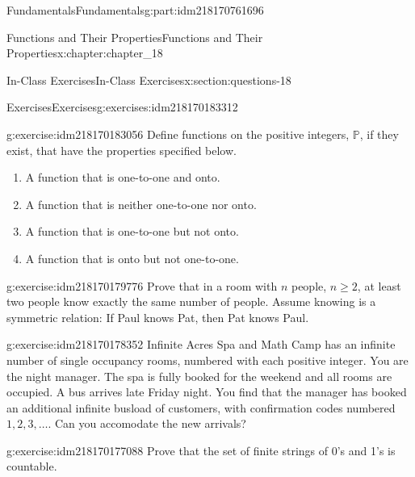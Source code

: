 \documentclass[oneside,10pt,]{book}
\numberwithin{equation}{section}
\begin{document}
\begin{partptx}{Fundamentals}{}{Fundamentals}{}{}{g:part:idm218170761696}
\begin{chapterptx}{Functions and Their Properties}{}{Functions and Their Properties}{}{}{x:chapter:chapter_18}
\typeout{************************************************}
%
\begin{sectionptx}{In-Class Exercises}{}{In-Class Exercises}{}{}{x:section:questions-18}
%
%
%
\typeout{************************************************}
\typeout{************************************************}
%
\begin{exercises-subsection-numberless}{Exercises}{}{Exercises}{}{}{g:exercises:idm218170183312}
\par\medskip\noindent%
%
\begin{exercisegroup}
\begin{divisionexerciseeg}{1}{}{}{g:exercise:idm218170183056}%
Define functions on the positive integers, \(\mathbb{P}\), if they exist, that have the properties specified below.%
\begin{enumerate}[label=(\alph*)]
\item{}A function that is one-to-one and onto.%
\item{}A function that is neither one-to-one nor onto.%
\item{}A function that is one-to-one but not onto.%
\item{}A function that is onto but not one-to-one.%
\end{enumerate}
%
\end{divisionexerciseeg}%
\begin{divisionexerciseeg}{2}{}{}{g:exercise:idm218170179776}%
Prove that in a room with \(n\) people, \(n \geq 2\), at least two people know exactly the same number of people. Assume knowing is a symmetric relation: If Paul knows Pat, then Pat knows Paul.%
\end{divisionexerciseeg}%
\begin{divisionexerciseeg}{3}{}{}{g:exercise:idm218170178352}%
Infinite Acres Spa and Math Camp has an infinite number of single occupancy rooms, numbered with each positive integer.  You are the night manager.  The spa is fully booked for the weekend and all rooms are occupied. A bus arrives late Friday night.  You find that the manager has booked an additional infinite busload of customers, with confirmation codes numbered \(1, 2, 3, \dots\).   Can you accomodate the new arrivals?%
\end{divisionexerciseeg}%
\begin{divisionexerciseeg}{4}{}{}{g:exercise:idm218170177088}%
Prove that the set of finite strings of 0's and 1's is countable.%
\end{divisionexerciseeg}%

\end{exercisegroup}
\end{exercises-subsection-numberless}
\end{sectionptx}
\end{chapterptx}
\end{partptx}
\end{document}
